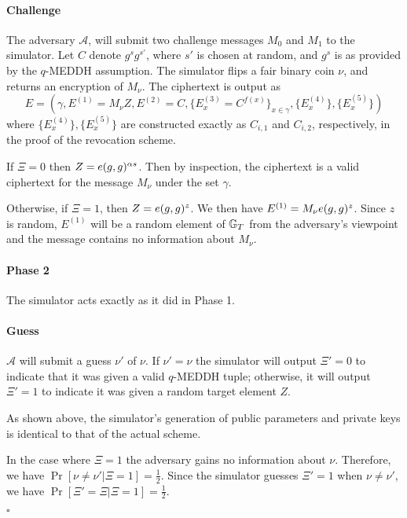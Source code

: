 \documentclass[a4paper, 11pt]{article}
\newenvironment{proof}{\par\noindent{\bf Proof.}}{$\square$\par\bigskip}
\theoremstyle{definition}
\begin{document}
\begin{proof}
%
%

\paragraph{Challenge}The adversary $\mathcal{A}$,
will submit two challenge messages $M_0$ and $M_1$ to the simulator.
Let $C$ denote $g^sg^{s'}$, where $s'$ is chosen at random, and $g^s$
is as provided by the $q$-MEDDH assumption.  The simulator flips a
fair binary coin $\nu$, and returns an encryption of $M_{\nu}$. The
ciphertext is output as
\[E = \left(
\gamma, E^{(1)} = M_{\nu} Z,
E^{(2)} = C,
\{E^{(3)}_x = C^{f(x)}\}_{x\in\gamma},
\{E^{(4)}_x \},
\{E^{(5)}_x \}
\right)
\]
where $\{E^{(4)}_x \}, \{E^{(5)}_x \}$ are constructed exactly as $C_{i,1}$
and $C_{i,2}$, respectively, in the proof of the revocation scheme.

If $\Xi=0$ then $Z=e(g,g)^{\alpha s}$. Then by inspection, the ciphertext
is a valid ciphertext for the message $M_\nu$ under the set
$\gamma$.

Otherwise, if $\Xi=1$, then $Z=e(g,g)^z$. We then have
$E^{(1)}=M_{\nu}e(g,g)^{z}$. Since $z$ is random, $E^{(1)}$ will be a
random element of $\mathbb{G}_T$ from the adversary's viewpoint and the
message contains no information about $M_\nu$.\\

\paragraph{Phase 2}The simulator acts exactly as
it did in Phase 1.

\paragraph{Guess}$\mathcal{A}$ will submit a
guess $\nu'$ of $\nu$. If $\nu'=\nu$ the simulator will output
$\Xi'=0$ to indicate that it was given a valid $q$-MEDDH tuple;
otherwise, it will output $\Xi'=1$ to indicate it was given a
random target element $Z$.

As shown above, the simulator's generation of public
parameters and private keys is identical to that of the actual
scheme.

In the case where $\Xi=1$ the adversary gains no information about
$\nu$. Therefore, we have $\Pr[\nu\neq\nu'|\Xi=1]=\frac{1}{2}$.
Since the simulator guesses $\Xi'=1$ when $\nu\neq\nu'$, we
have $\Pr[\Xi'=\Xi|\Xi=1]=\frac{1}{2}$.


\end{proof}
\end{document}
